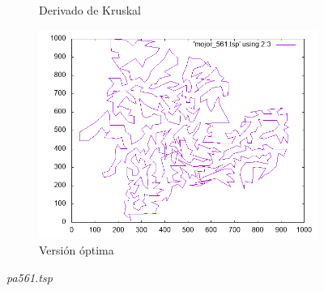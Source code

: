 \documentclass[12pt,spanish]{article}
\begin{document}
\begin{figure}[H]
\begin{subfigure}[b]{0.36\textwidth}
\caption{Derivado de Kruskal}
\end{subfigure}
\quad
\begin{subfigure}[b]{0.36\textwidth}
\includegraphics[width=\textwidth]{pa561_mejor.png}
\caption{Versión óptima}
\end{subfigure}
\caption{\textit{pa561.tsp}}
\end{figure}
\end{document}
